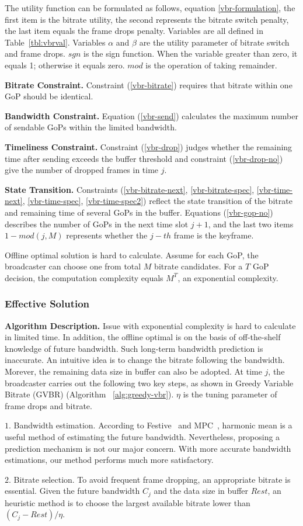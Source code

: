 The utility function can be formulated as follows, equation \ref{vbr-formulation}, the first item is the bitrate utility, the second represents the bitrate switch penalty, the last item equals the frame drops penalty. Variables are all defined in Table~\ref{tbl:vbrval}. Variables $\alpha$ and $\beta$ are the utility parameter of bitrate switch and frame drops. $sgn$ is the sign function. When the variable greater than zero, it equals 1; otherwise it equals zero. $mod$ is the operation of taking remainder.

\textbf{Bitrate Constraint.} Constraint (\ref{vbr-bitrate}) requires that bitrate within one GoP should be identical.

\textbf{Bandwidth Constraint.} Equation (\ref{vbr-send}) calculates the maximum number of sendable GoPs within the limited bandwidth.

\textbf{Timeliness Constraint.} Constraint (\ref{vbr-drop}) judges whether the remaining time after sending exceeds the buffer threshold and constraint (\ref{vbr-drop-no}) give the number of dropped frames in time $j$.

\textbf{State Transition.} Constraints (\ref{vbr-bitrate-next}, \ref{vbr-bitrate-spec}, \ref{vbr-time-next}, \ref{vbr-time-spec}, \ref{vbr-time-spec2}) reflect the state transition of the bitrate and remaining time of several GoPs in the buffer. Equations (\ref{vbr-gop-no}) describes the number of GoPs in the next time slot $j+1$, and the last two items $1-mod(j,M)$ represents whether the $j-th$ frame is the keyframe.

Offline optimal solution is hard to calculate. Assume for each GoP, the broadcaster can choose one from total $M$ bitrate candidates. For a $T$ GoP decision, the computation complexity equals $M^T$, an exponential complexity.

\subsubsection{Effective Solution}

\textbf{Algorithm Description.} Issue with exponential complexity is hard to calculate in limited time. In addition, the offline optimal is on the basis of off-the-shelf knowledge of future bandwidth. Such long-term bandwidth prediction is inaccurate. An intuitive idea is to change the bitrate following the bandwidth. Morever, the remaining data size in buffer can also be adopted. At time $j$, the broadcaster carries out the following two key steps, as shown in Greedy Variable Bitrate (GVBR) (Algorithm ~\ref{alg:greedy-vbr}). $\eta$ is the tuning parameter of frame drops and bitrate.

$1.$ Bandwidth estimation. According to Festive~\cite{jiang2014improving} and MPC~\cite{yin2015control}, harmonic mean is a useful method of estimating the future bandwidth. Nevertheless, proposing a prediction mechanism is not our major concern. With more accurate bandwidth estimations, our method performs much more satisfactory.

$2.$ Bitrate selection. To avoid frequent frame dropping, an appropriate bitrate is essential. Given the future bandwidth $C_j$ and the data size in buffer $Rest$, an heuristic method is to choose the largest available bitrate lower than $(C_j-Rest)/\eta$.

